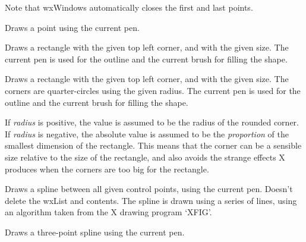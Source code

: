 Note that wxWindows automatically closes the first and last points.

\label{wxdcdrawpoint}


Draws a point using the current pen.

\label{wxdcdrawrectangle}


Draws a rectangle with the given top left corner, and with the given
size.  The current pen is used for the outline and the current brush
for filling the shape.

\label{wxdcdrawroundedrectangle}


Draws a rectangle with the given top left corner, and with the given
size.  The corners are quarter-circles using the given radius. The
current pen is used for the outline and the current brush for filling
the shape.

If {\it radius} is positive, the value is assumed to be the
radius of the rounded corner. If {\it radius} is negative,
the absolute value is assumed to be the {\it proportion} of the smallest
dimension of the rectangle. This means that the corner can be
a sensible size relative to the size of the rectangle, and also avoids
the strange effects X produces when the corners are too big for
the rectangle.

\label{wxdcdrawspline}


Draws a spline between all given control points, using the current
pen.  Doesn't delete the wxList and contents. The spline is drawn
using a series of lines, using an algorithm taken from the X drawing
program `XFIG'.


Draws a three-point spline using the current pen.

\label{wxdcdrawtext}

